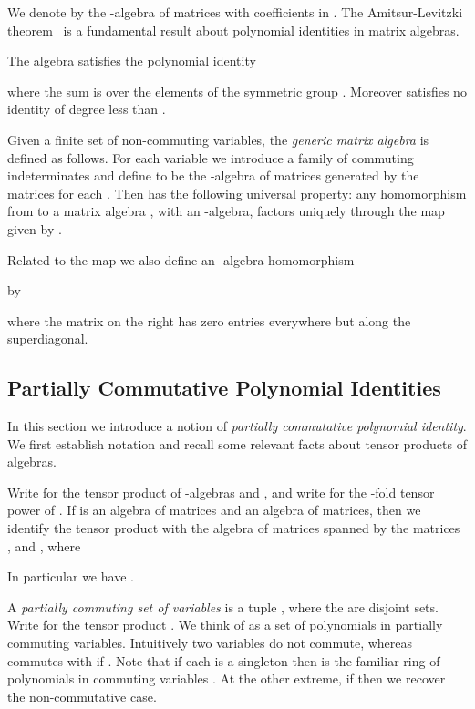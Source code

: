 \documentclass[runningheads]{llncs}
\begin{document}
We denote by  the -algebra of  matrices with
coefficients in .  The Amitsur-Levitzki theorem~\cite{AL50,Cohn03}
is a fundamental result about polynomial identities in matrix
algebras.
\begin{theorem}
The algebra  satisfies the polynomial identity

where the sum is over the  elements of the symmetric group .
Moreover  satisfies no identity of degree less than .
\label{thm:AL}
\end{theorem}


Given a finite set  of non-commuting variables, the \emph{generic
   matrix algebra}  is defined as
follows.  For each variable  we introduce a family of
commuting indeterminates  and
define  to be the -algebra of 
matrices generated by the matrices  for each .
Then  has the following universal property: any
homomorphism from  to a matrix algebra ,
with  an -algebra, factors uniquely through the map  given by
.  

Related to the map  we also define an -algebra homomorphism

by 
 
where the matrix on the right has zero entries everywhere but along
the superdiagonal.

\subsection{Partially Commutative Polynomial Identities}
In this section we introduce a notion of \emph{partially commutative
  polynomial identity}.  We first establish notation and recall some
relevant facts about tensor products of algebras.  


Write  for the tensor product of -algebras  and ,
and write  for the -fold tensor power of .  If
 is an algebra of  matrices and  an algebra of
 matrices, then we identify the tensor product 
with the algebra of  matrices spanned by the
matrices ,  and
, where 

In particular we have .

A \emph{partially commuting set of variables} is a tuple
, where the  are disjoint sets.
Write  for the tensor product
.  We
think of  as a set of polynomials in
partially commuting variables.  Intuitively two variables  do not commute, whereas  commutes with  if
.  Note that if each  is a singleton  then  is the familiar ring of polynomials in
commuting variables .  At the other extreme, if 
then we recover the non-commutative case.
\end{document}
